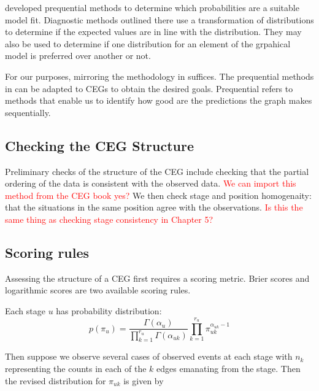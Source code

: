 \documentclass[12pt]{article}
\begin{document}
\cite{DAWID} developed prequential methods to determine which probabilities are a suitable model fit. Diagnostic methods outlined there use a transformation of distributions to determine if the expected values are in line with the distribution. They may also be used to determine if one distribution for an element of the grpahical model is preferred over another or not.


%

For our purposes, mirroring the methodology in \cite{diagnostics} suffices. The prequential methods in \cite{diagnostics} can be adapted to CEGs to obtain the desired goals. Prequential refers to methods that enable us to identify how good are the predictions the graph makes sequentially. 

\subsection{Checking the CEG Structure}

Preliminary checks of the structure of the CEG include checking that the partial ordering of the data is consistent with the observed data. \textcolor{red}{We can import this method from the CEG book yes?} We then check stage and position homogenaity: that the situations in the same position agree with the observations. \textcolor{red}{Is this the same thing as checking stage consistency in Chapter 5? }


 
\subsection{Scoring rules}


Assessing the structure of a CEG first requires a scoring metric. Brier scores and logarithmic scores are two available scoring rules. 

Each stage $u$ has probability distribution:
\[
p(\pi_u) = \frac{\Gamma (\alpha_u)}{\prod_{k=1}^{r_u} \Gamma (\alpha_{uk})} \prod_{k=1}^{r_u} \pi_{uk} ^{\alpha_{uk}-1}
\]

Then suppose we observe several cases of observed events at each stage with $n_k$ representing the counts in each of the $k$ edges emanating from the stage. Then the  revised distribution for $\pi_{uk}$ is given by 
\end{document}
